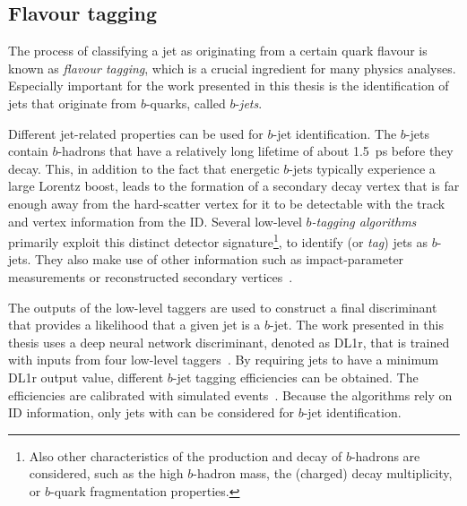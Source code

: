 \subsection{Flavour tagging}
The process of classifying a jet as originating from a certain quark flavour is known as \emph{flavour tagging}, which is a crucial ingredient for many physics analyses. Especially important for the work presented in this thesis is the identification of jets that originate from $b$-quarks, called $b$-\emph{jets}.

Different jet-related properties can be used for $b$-jet identification.
The $b$-jets contain $b$-hadrons that have a relatively long lifetime of about \SI{1.5}{\pico\second} before they decay. This, in addition to the fact that energetic $b$-jets typically experience a large Lorentz boost, leads to the formation of a secondary decay vertex that is far enough away from the hard-scatter vertex for it to be detectable with the track and vertex information from the ID.
Several low-level \emph{$b$-tagging algorithms} primarily exploit this distinct detector signature\footnote{Also other characteristics of the production and decay of $b$-hadrons are considered, such as the high $b$-hadron mass, the (charged) decay multiplicity, or $b$-quark fragmentation properties.}, to identify (or \emph{tag}) jets as $b$-jets. They also make use of other information such as impact-parameter measurements or reconstructed secondary vertices~\cite{ATL-PHYS-PUB-2017-013}.

The outputs of the low-level taggers are used to construct a final discriminant that provides a likelihood that a given jet is a $b$-jet. The work presented in this thesis uses a deep neural network discriminant, denoted as DL1r, that is trained with inputs from four low-level taggers~\cite{ATL-PHYS-PUB-2017-013}.
By requiring jets to have a minimum DL1r output value, different $b$-jet tagging efficiencies can be obtained. The efficiencies are calibrated with simulated \ttbar events~\cite{FTAG-2018-01}.
Because the algorithms rely on ID information, only jets with  can be considered for $b$-jet identification.



